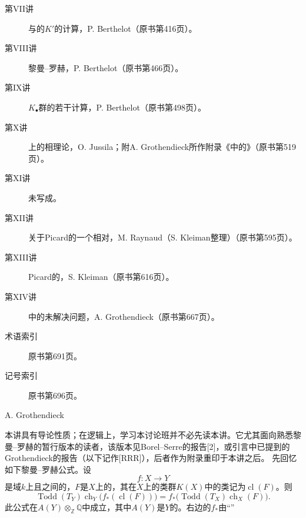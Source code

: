 \begin{description}
\item[第VII讲] 与的$K'$的计算，P. Berthelot（原书第416页）。
\item[第VIII讲] 黎曼--罗赫，P. Berthelot（原书第466页）。
\item[第IX讲] $K_{\bullet}$群的若干计算，P. Berthelot（原书第498页）。
\item[第X讲] 上的相理论，O. Jussila；附A. Grothendieck所作附录《中的》（原书第519页）。
\item[第XI讲] 未写成。
\item[第XII讲] 关于Picard的一个相对，M. Raynaud（S. Kleiman整理）（原书第595页）。
\item[第XIII讲] Picard的，S. Kleiman（原书第616页）。
\item[第XIV讲] 中的未解决问题，A. Grothendieck（原书第667页）。
\item[术语索引] 原书第691页。
\item[记号索引] 原书第696页。
\end{description}
\begin{center}A. Grothendieck\end{center}
本讲具有导论性质；在逻辑上，学习本讨论班并不必先读本讲。它尤其面向熟悉黎曼--罗赫的暂行版本的读者，该版本见Borel--Serre的报告[2]，或引言中已提到的Grothendieck的报告（以下记作[RRR]），后者作为附录重印于本讲之后。
先回忆如下黎曼--罗赫公式。设
\[f:X\longrightarrow Y\]
是域$k$上且之间的，$F$是$X$上的，其在$X$上的类群$K(X)$中的类记为$\operatorname{cl}(F)$。则
\[
\operatorname{Todd}(T_Y)\operatorname{ch}_Y\bigl(f_*(\operatorname{cl}(F))\bigr)
=f_*\bigl(\operatorname{Todd}(T_X)\operatorname{ch}_X(F)\bigr).
\tag{1.1}
\]
此公式在$A(Y)\otimes_{\mathbb Z}\mathbb Q$中成立，其中$A(Y)$是$Y$的。右边的$f_*$由“”
